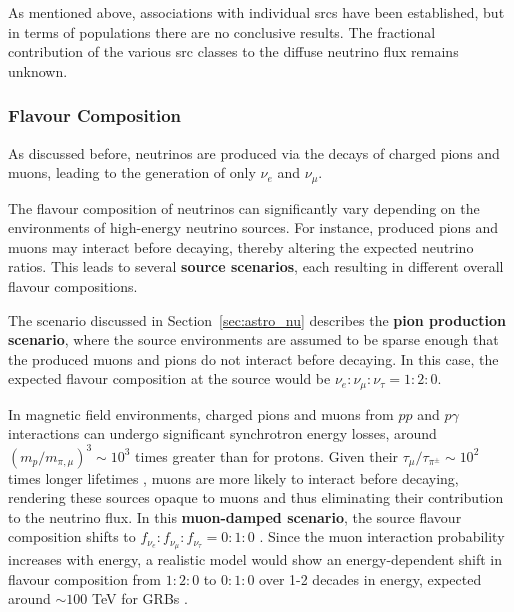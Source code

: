 As mentioned above, associations with individual srcs have been established, but in terms of populations there are no conclusive results. The fractional contribution of the various src classes to the diffuse neutrino flux remains unknown.

\subsubsection{Flavour Composition}
\label{sec:flavor_theory}
As discussed before, neutrinos are produced via the decays of charged pions and muons, leading to the generation of only $\nu_e$ and $\nu_\mu$.


The flavour composition of neutrinos can significantly vary depending on the environments of high-energy neutrino sources. For instance, produced pions and muons may interact before decaying, thereby altering the expected neutrino ratios. This leads to several \textbf{source scenarios}, each resulting in different overall flavour compositions.

The scenario discussed in Section~\ref{sec:astro_nu} describes the \textbf{pion production scenario}, where the source environments are assumed to be sparse enough that the produced muons and pions do not interact before decaying. In this case, the expected flavour composition at the source would be $\nu_e:\nu_{\mu}:\nu_{\tau} = 1:2:0$.


In magnetic field environments, charged pions and muons from $pp$ and $p\gamma$ interactions can undergo significant synchrotron energy losses, around $(m_p/m_{\pi,\mu})^3 \sim 10^3$ times greater than for protons. Given their $\tau_\mu/\tau_{\pi^\pm} \sim 10^2$ times longer lifetimes , muons are more likely to interact before decaying, rendering these sources opaque to muons and thus eliminating their contribution to the neutrino flux. In this \textbf{muon-damped scenario}, the source flavour composition shifts to $f_{\nu_e} : f_{\nu_\mu} : f_{\nu_\tau} = 0 : 1 : 0$ . Since the muon interaction probability increases with energy, a realistic model would show an energy-dependent shift in flavour composition from $1 : 2 : 0$ to $0 : 1 : 0$ over 1-2 decades in energy, expected around $\sim 100$ TeV for GRBs .

